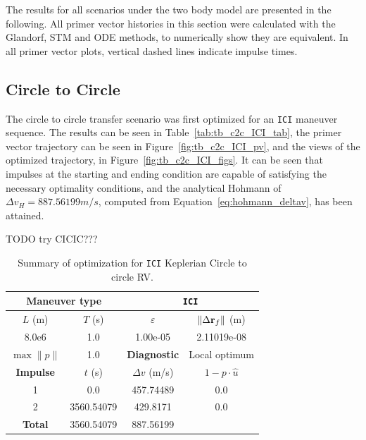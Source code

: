 The results for all scenarios under the two body model are presented in the following. All primer vector histories in this section were calculated with the Glandorf, STM and ODE methods, to numerically show they are equivalent. In all primer vector plots, vertical dashed lines indicate impulse times.

\subsection{Circle to Circle}

The circle to circle transfer scenario was first optimized for an \texttt{ICI} maneuver sequence. The results can be seen in Table~\ref{tab:tb_c2c_ICI_tab}, the primer vector trajectory can be seen in Figure~\ref{fig:tb_c2c_ICI_pv}, and the views of the optimized trajectory, in Figure~\ref{fig:tb_c2c_ICI_figs}. It can be seen that impulses at the starting and ending condition are capable of satisfying the necessary optimality conditions, and the analytical Hohmann of \(\Delta v_H = 887.56199 m/s\), computed from Equation~\eqref{eq:hohmann_deltav}, has been attained.

TODO try CICIC???

\begin{table}[htpb]
    \centering
    \begin{tabular}{cccc} \toprule
    \multicolumn{2}{c}{\textbf{Maneuver type}} & \multicolumn{2}{c}{\texttt{ICI}} \\ \midrule
    \(L\) (m) & \(T\) (s) & \(\varepsilon\) & \(\lVert \Delta \mathbf{r}_{f} \rVert\) (m)    \\ \midrule
    8.0e6          & 1.0          & 1.00e-05                & 2.11019e-08                        \\ \midrule
    \(\max \lVert p \rVert\) & 1.0     & \textbf{Diagnostic}   & Local optimum        \\ \midrule
    \textbf{Impulse} & \(t\) (s) & \(\Delta v\) (m/s) & \(1 - p \cdot \hat{u}\) \\ \midrule
    1                 & 0.0          & 457.74489             & 0.0                    \\
    2                 & 3560.54079          & 429.8171             & 0.0                    \\\midrule
    \textbf{Total}   & 3560.54079          & 887.56199             &                     \\ \bottomrule   
    \end{tabular}
    \caption{Summary of optimization for \texttt{ICI} Keplerian Circle to circle RV.}
    \label{tab:tb_ctcr_ICI_tab}
\end{table}

